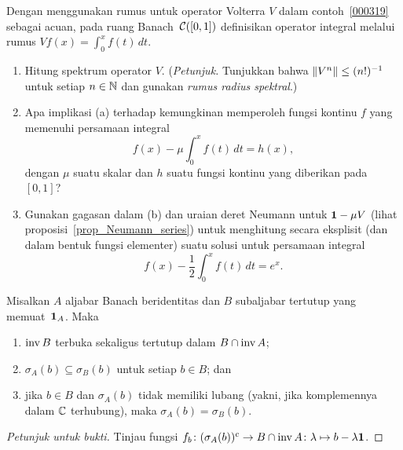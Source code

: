 \begin{exer} Dengan menggunakan rumus untuk operator Volterra $V$ dalam contoh~\ref{000319} sebagai
acuan, pada ruang Banach~$\mathcal{C}([0,1])$ definisikan operator integral melalui rumus $Vf(x)=\int_0^x f(t)\,dt$.
 \begin{enumerate}
  \item[(a)] Hitung spektrum operator $V$. (\emph{Petunjuk.} Tunjukkan bahwa $\lVert V^n\rVert
\le (n!)^{-1}$ untuk setiap $n \in \mathbb{N}$ dan gunakan \emph{rumus radius spektral}.)
  \item[(b)] Apa implikasi (a) terhadap kemungkinan memperoleh fungsi kontinu $f$ yang
memenuhi persamaan integral
   \[ f(x) - \mu\int_0^xf(t)\,dt = h(x), \]
dengan $\mu$ suatu skalar dan $h$ suatu fungsi kontinu yang diberikan pada~$[0,1]$?
  \item[(c)] Gunakan gagasan dalam (b) dan uraian deret Neumann untuk $\mathbf{1} - \mu V$ (lihat
proposisi~\ref{prop_Neumann_series}) untuk menghitung secara eksplisit (dan dalam bentuk fungsi elementer)
suatu solusi untuk persamaan integral
 \[f(x) - {\textstyle \frac12}\int_0^xf(t)\,dt = e^x.\]
 \end{enumerate}
\end{exer}

\begin{prop} Misalkan $A$ aljabar Banach beridentitas dan $B$ subaljabar tertutup yang memuat~$\mathbf{1}_A$.
Maka
 \begin{enumerate}[label=\rm{(\alph*)}]
   \item $\operatorname{inv} B$ terbuka sekaligus tertutup dalam $B \cap \operatorname{inv} A$;
   \item $\sigma_A(b) \subseteq \sigma_B(b)$ untuk setiap $b \in B$; dan
   \item jika $b \in B$ dan $\sigma_A(b)$ tidak memiliki lubang (yakni, jika komplemennya dalam $\mathbb{C}$
terhubung), maka $\sigma_A(b) =    \sigma_B(b)$.
 \end{enumerate}
\end{prop}

\begin{proof}[\emph{Petunjuk untuk bukti}] Tinjau fungsi
$f_b\colon (\sigma_A(b))^c \rightarrow B \cap \operatorname{inv} A\colon \lambda \mapsto b - \lambda \mathbf{1}$.   \ns
\end{proof}















